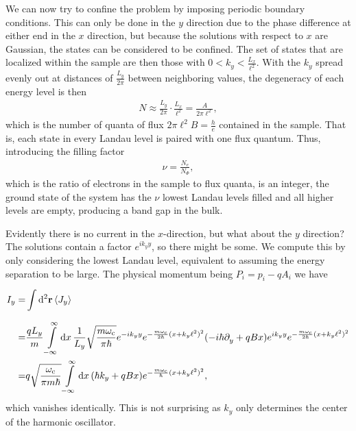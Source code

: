 We can now try to confine the problem by imposing periodic boundary conditions. This can only be done in the $y$ direction due to the phase difference at either end in the $x$ direction, but because the solutions with respect to $x$ are Gaussian, the states can be considered to be confined. The set of states that are localized within the sample are then those with $0 < k_{y} < \frac{L_{x}}{\ell^{2}}$. With the $k_{y}$ spread evenly out at distances of $\frac{L_{y}}{2\pi}$ between neighboring values, the degeneracy of each energy level is then
\begin{align*}
	N \approx \frac{L_{y}}{2\pi}\cdot \frac{L_{x}}{\ell^{2}} = \frac{A}{2\pi\ell^{2}},
\end{align*}
which is the number of quanta of flux $2\pi\ell^{2}B = \frac{h}{e}$ contained in the sample. That is, each state in every Landau level is paired with one flux quantum. Thus, introducing the filling factor
\begin{align*}
	\nu = \frac{N_{e}}{N_{\Phi}},
\end{align*}
which is the ratio of electrons in the sample to flux quanta, is an integer, the ground state of the system has the $\nu$ lowest Landau levels filled and all higher levels are empty, producing a band gap in the bulk.

Evidently there is no current in the $x$-direction, but what about the $y$ direction? The solutions contain a factor $e^{ik_{y}y}$, so there might be some. We compute this by only considering the lowest Landau level, equivalent to assuming the energy separation to be large. The physical momentum being $P_{i} = p_{i} - qA_{i}$ we have
\begin{align*}
	I_{y} =& \int\limits_{}^{}\dd[2]{\vb{r}}\expval{J_{y}} \\
	      =& \frac{qL_{y}}{m}\int\limits_{-\infty}^{\infty}\dd{x}\frac{1}{L_{y}}\sqrt{\frac{m\omega_{\text{c}}}{\pi\hbar}}e^{-ik_{y}y}e^{-\frac{m\omega_{\text{c}}}{2\hbar}(x + k_{y}\ell^{2})^{2}}(-i\hbar\partial^{}_{y} + qBx)e^{ik_{y}y}e^{-\frac{m\omega_{\text{c}}}{2\hbar}(x + k_{y}\ell^{2})^{2}} \\
	      =& q\sqrt{\frac{\omega_{\text{c}}}{\pi m\hbar}}\int\limits_{-\infty}^{\infty}\dd{x}(\hbar k_{y} + qBx)e^{-\frac{m\omega_{\text{c}}}{\hbar}(x + k_{y}\ell^{2})^{2}},
\end{align*}
which vanishes identically. This is not surprising as $k_{y}$ only determines the center of the harmonic oscillator.

